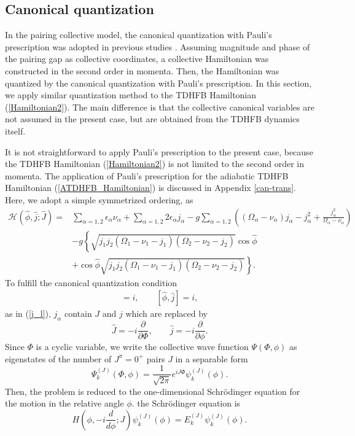\documentclass[11pt]{book} %
\begin{document}
\subsection{Canonical quantization}
\label{sec:canonical}
In the pairing collective model, the canonical quantization with Pauli's prescription
was adopted in previous studies \cite{BBPK70,GPBW85, ZPPRS99, P07}.
Assuming magnitude and phase of the pairing gap as collective coordinates,
a collective Hamiltonian was constructed in the second order in momenta.
Then, the Hamiltonian was quantized by the canonical quantization
with Pauli's prescription.
In this section, we apply similar quantization method to
the TDHFB Hamiltonian (\ref{Hamiltonian2}).
The main difference is that the collective canonical variables are
not assumed in the present case, but are obtained from the TDHFB dynamics
itself.\par
It is not straightforward to apply Pauli's prescription
to the present case, 
because the TDHFB Hamiltonian (\ref{Hamiltonian2})
is not limited to the second order in momenta.
The application of Pauli's prescription for the adiabatic TDHFB Hamiltonian (\ref{ATDHFB_Hamiltonian}) is discussed in Appendix \ref{can-trans}.
Here, 
we adopt a simple symmetrized ordering, as
\begin{align}
	\mathcal{H}(\hat{\phi},\hat{j};\hat{J})
	=& \sum_{\alpha=1,2} \epsilon_{\alpha}\nu_{\alpha} + \sum_{\alpha=1,2} 2\epsilon_{\alpha}j_{\alpha} - g\sum_{\alpha=1,2} \left( (\Omega_{\alpha}-\nu_{\alpha}) j_{\alpha} - j_{\alpha}^2 +\frac{j_{\alpha}^2}{\Omega_{\alpha}-\nu_{\alpha}} \right) \nonumber \\
	&- g \left\{ \sqrt{j_1j_2(\Omega_{1}-\nu_{1}-j_{1})(\Omega_{2}-\nu_{2}-j_{2})}\cos{\hat{\phi}} \right. \nonumber \\
	&\left. + \cos{\hat{\phi}}\sqrt{j_1j_2(\Omega_{1}-\nu_{1}-j_{1})(\Omega_{2}-\nu_{2}-j_{2})} \right\} .
\label{canonical_quantized_H}
\end{align}
To fulfill the canonical quantization condition
\begin{align}
 [\hat{\Phi},\hat{J}]=i, \quad\quad [\hat{\phi},\hat{j}]=i ,
\end{align}
as in (\ref{j_l}), $j_{\alpha}$ contain $J$ and $j$ which
are replaced by
\begin{equation}
	\hat{J} = -i\frac{\partial}{\partial\Phi},\quad\quad
	\hat{j} = -i\frac{\partial}{\partial\phi} .
\end{equation}
Since $\Phi$ is a cyclic variable, 
we write the collective wave function $\Psi(\Phi,\phi)$ as eigenstates
of the number of $J^{\pi}=0^+$ pairs $J$ in a separable form
\begin{equation}
  \Psi_k^{(J)}(\Phi,\phi) = 
	\frac{1}{\sqrt{2\pi}}e^{iJ\Phi}\psi_k^{(J)}(\phi) .
\end{equation}
Then, the problem is reduced to the one-dimensional Schr\"{o}dinger
equation for the motion in the relative angle $\phi$.
the Schr\"{o}dinger equation is
\begin{equation}
	H\left( \phi,-i\frac{d}{d\phi};J \right)
	\psi_k^{(J)}(\phi) = E_k^{(J)}\psi_k^{(J)}(\phi) .
	\label{Schroedinger_eq}
\end{equation}
\end{document}
